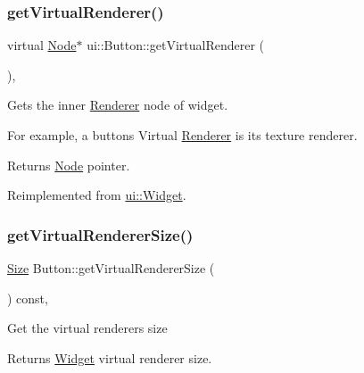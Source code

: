 \subsubsection{\texorpdfstring{get\+Virtual\+Renderer()}{getVirtualRenderer()}\hspace{0.1cm}{\footnotesize\ttfamily [2/2]}}
{\footnotesize\ttfamily virtual \hyperlink{classNode}{Node}$\ast$ ui\+::\+Button\+::get\+Virtual\+Renderer (\begin{DoxyParamCaption}{ }\end{DoxyParamCaption})\hspace{0.3cm}{\ttfamily [override]}, {\ttfamily [virtual]}}

Gets the inner \hyperlink{classRenderer}{Renderer} node of widget.

For example, a button\textquotesingle{}s Virtual \hyperlink{classRenderer}{Renderer} is it\textquotesingle{}s texture renderer.

\begin{DoxyReturn}{Returns}
\hyperlink{classNode}{Node} pointer. 
\end{DoxyReturn}


Reimplemented from \hyperlink{classui_1_1Widget_acf862bf9235fbb3823819eeb65d46f25}{ui\+::\+Widget}.

\mbox{\label{classui_1_1Button_aaae39c5dc7a9e11c1b68d4b0f3b7dcb0}} 
\subsubsection{\texorpdfstring{get\+Virtual\+Renderer\+Size()}{getVirtualRendererSize()}\hspace{0.1cm}{\footnotesize\ttfamily [1/2]}}
{\footnotesize\ttfamily \hyperlink{classSize}{Size} Button\+::get\+Virtual\+Renderer\+Size (\begin{DoxyParamCaption}{ }\end{DoxyParamCaption}) const\hspace{0.3cm}{\ttfamily [override]}, {\ttfamily [virtual]}}

Get the virtual renderer\textquotesingle{}s size \begin{DoxyReturn}{Returns}
\hyperlink{classui_1_1Widget}{Widget} virtual renderer size. 
\end{DoxyReturn}


